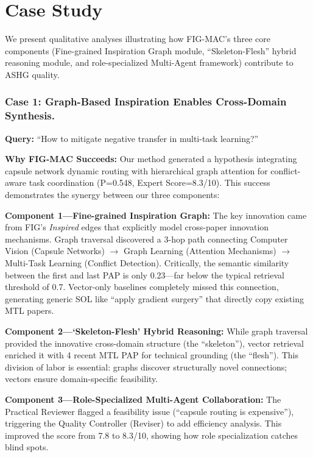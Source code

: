\documentclass[runningheads]{llncs}
\begin{document}
\section{Case Study}
\label{sec:case_study}

We present qualitative analyses illustrating how FIG-MAC's three core components (Fine-grained Inspiration Graph module, ``Skeleton-Flesh'' hybrid reasoning module, and role-specialized Multi-Agent framework) contribute to ASHG quality.

\subsubsection{Case 1: Graph-Based Inspiration Enables Cross-Domain Synthesis.}
\label{sec:case1}

\textbf{Query:} ``How to mitigate negative transfer in multi-task learning?''

\textbf{Why FIG-MAC Succeeds:} Our method generated a hypothesis integrating capsule network dynamic routing with hierarchical graph attention for conflict-aware task coordination (P=0.548, Expert Score=8.3/10). This success demonstrates the synergy between our three components:

\textbf{Component 1---Fine-grained Inspiration Graph:} The key innovation came from FIG's \emph{Inspired} edges that explicitly model cross-paper innovation mechanisms. Graph traversal discovered a 3-hop path connecting Computer Vision (Capsule Networks) $\rightarrow$ Graph Learning (Attention Mechanisms) $\rightarrow$ Multi-Task Learning (Conflict Detection). Critically, the semantic similarity between the first and last PAP is only 0.23---far below the typical retrieval threshold of 0.7. Vector-only baselines completely missed this connection, generating generic SOL like ``apply gradient surgery'' that directly copy existing MTL papers.

\textbf{Component 2---`Skeleton-Flesh' Hybrid Reasoning:} While graph traversal provided the innovative cross-domain structure (the ``skeleton''), vector retrieval enriched it with 4 recent MTL PAP for technical grounding (the ``flesh''). This division of labor is essential: graphs discover structurally novel connections; vectors ensure domain-specific feasibility.

\textbf{Component 3---Role-Specialized Multi-Agent Collaboration:} The Practical Reviewer flagged a feasibility issue (``capsule routing is expensive''), triggering the Quality Controller (Reviser) to add efficiency analysis. This improved the score from 7.8 to 8.3/10, showing how role specialization catches blind spots.
\end{document}
